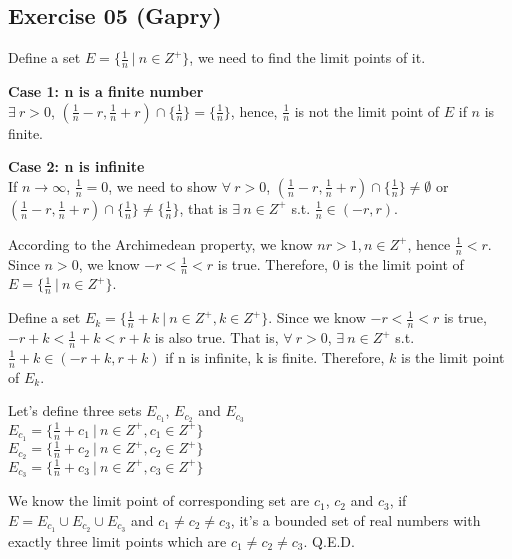 \subsection*{Exercise 05 (Gapry)}

\begin{flushleft}

Define a set $E = \{\frac{1}{n} \ | \ n \in Z^{+}\}$, we need to find the
limit points of it.
\vspace{10px}

\textbf{Case 1: n is a finite number} \\
$\exists\ r > 0$, $(\frac{1}{n} - r, \frac{1}{n} + r) \cap \{\frac{1}{n}\}
                                                         = \{\frac{1}{n}\}$,
hence, $\frac{1}{n}$ is not the limit point of $E$ if $n$ is finite.
\vspace{10px}

\textbf{Case 2: n is infinite} \\
If $n \to \infty$, $\frac{1}{n} = 0$, we need to show 
$\forall\ r > 0$, $(\frac{1}{n} - r, \frac{1}{n} + r) \cap \{\frac{1}{n}\} 
\neq \emptyset$ or $(\frac{1}{n} - r, \frac{1}{n} + r) \cap \{\frac{1}{n}\} 
\neq \{\frac{1}{n}\}$, that is $\exists\ n \in Z^{+}$ s.t. $\frac{1}{n} \in 
(-r, r)$. 
\vspace{10px}

According to the Archimedean property, we know $nr > 1, n \in Z^{+}$, hence
$\frac{1}{n} < r$. Since $n > 0$, we know $-r < \frac{1}{n} < r$ is true. 
Therefore, $0$ is the limit point of $E = \{\frac{1}{n} \ | \ n \in Z^{+}\}$.
\vspace{10px}

Define a set $E_k = \{\frac{1}{n} + k \ | \ n \in Z^{+}, k \in Z^{+}\}$. Since
we know $-r < \frac{1}{n} < r$ is true, $-r + k < \frac{1}{n} + k < r + k$ is 
also true. That is, $\forall\ r > 0$, $\exists\ n \in Z^{+}$ s.t. 
$\frac{1}{n} + k \in (-r + k, r + k)$ if n is infinite, k is finite. 
Therefore, $k$ is the limit point of $E_k$.
\vspace{10px}

Let's define three sets $E_{c_1}$, $E_{c_2}$ and $E_{c_3}$ \\
$E_{c_1} = \{\frac{1}{n} + c_1 \ | \ n \in Z^{+}, c_1 \in Z^{+}\}$ \\
$E_{c_2} = \{\frac{1}{n} + c_2 \ | \ n \in Z^{+}, c_2 \in Z^{+}\}$ \\
$E_{c_3} = \{\frac{1}{n} + c_3 \ | \ n \in Z^{+}, c_3 \in Z^{+}\}$ \\
\vspace{10px}

We know the limit point of corresponding set are $c_1$, $c_2$ and $c_3$, 
if $E = E_{c_1} \cup E_{c_2} \cup E_{c_3}$ and $c_1 \neq c_2 \neq c_3$,
it's a bounded set of real numbers with exactly three limit points which are
$c_1 \neq c_2 \neq c_3$. Q.E.D.

\end{flushleft}